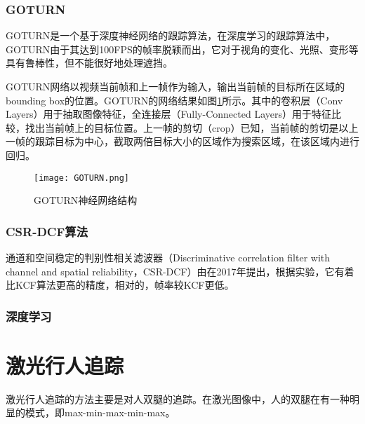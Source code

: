 \subsubsection{GOTURN}

  GOTURN是一个基于深度神经网络的跟踪算法\cite{held2016learning}，在深度学习的跟踪算法中，GOTURN由于其达到100FPS的帧率脱颖而出，它对于视角的变化、光照、变形等具有鲁棒性，但不能很好地处理遮挡。

  GOTURN网络以视频当前帧和上一帧作为输入，输出当前帧的目标所在区域的bounding box的位置。GOTURN的网络结果如图\ref{fig:GOTURN}所示。其中的卷积层（Conv Layers）用于抽取图像特征，全连接层（Fully-Connected Layers）用于特征比较，找出当前帧上的目标位置。上一帧的剪切（crop）已知，当前帧的剪切是以上一帧的跟踪目标为中心，截取两倍目标大小的区域作为搜索区域，在该区域内进行回归。

\begin{figure}[htb]
  \centering
  \texttt{[image: GOTURN.png]}
  \caption{GOTURN神经网络结构}
  \label{fig:GOTURN}
\end{figure}

\subsubsection{CSR-DCF算法}
  通道和空间稳定的判别性相关滤波器（Discriminative correlation filter with channel and spatial reliability，CSR-DCF）由\citet{lukezic2017discriminative}在2017年提出，根据实验，它有着比KCF算法更高的精度，相对的，帧率较KCF更低。

\subsubsection{深度学习}

\section{激光行人追踪}
激光行人追踪的方法主要是对人双腿的追踪。在激光图像中，人的双腿在有一种明显的模式，即max-min-max-min-max。

